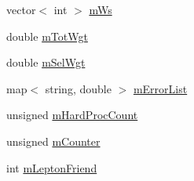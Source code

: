 \begin{DoxyCompactItemize}
\item 
vector$<$ int $>$ \hyperlink{class_herwig_1_1_herwig_tree_a19bd4f1ed5bc10ff4523cf3f8120b670}{m\+Ws}
\item 
double \hyperlink{class_herwig_1_1_herwig_tree_a60ae5fcc1fff4256bdd35074035e6a32}{m\+Tot\+Wgt}
\item 
double \hyperlink{class_herwig_1_1_herwig_tree_a2d1cb6fc4a481866ede3796640f05e87}{m\+Sel\+Wgt}
\item 
map$<$ string, double $>$ \hyperlink{class_herwig_1_1_herwig_tree_aa58f96f1caffd3e013d2f341de98bf28}{m\+Error\+List}
\item 
unsigned \hyperlink{class_herwig_1_1_herwig_tree_a211506013383c5057459219813924383}{m\+Hard\+Proc\+Count}
\item 
unsigned \hyperlink{class_herwig_1_1_herwig_tree_aff68962320b3b854debe9db4d52d076a}{m\+Counter}
\item 
int \hyperlink{class_herwig_1_1_herwig_tree_a3dc3453c672a72bce7ca90d9216e7df8}{m\+Lepton\+Friend}
\end{DoxyCompactItemize}
